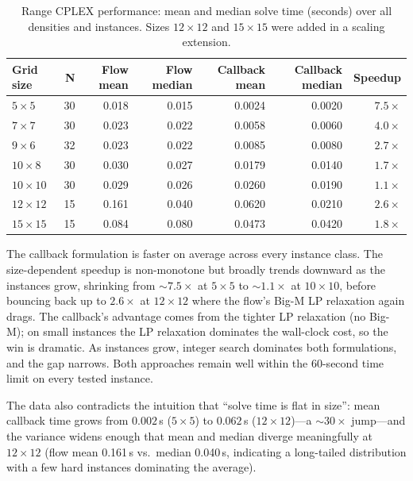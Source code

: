 \begin{table}[H]
  \centering
  \caption{Range CPLEX performance: mean and median solve time (seconds) over all densities and instances. Sizes $12\times12$ and $15\times15$ were added in a scaling extension.}
  \label{tab:range_summary}
  \begin{tabular}{lrrrrrr}
    \toprule
    Grid size & N & Flow mean & Flow median & Callback mean & Callback median & Speedup \\
    \midrule
    $5  \times 5$   & 30 & 0.018 & 0.015 & 0.0024 & 0.0020 & $7.5\times$ \\
    $7  \times 7$   & 30 & 0.023 & 0.022 & 0.0058 & 0.0060 & $4.0\times$ \\
    $9  \times 6$   & 32 & 0.023 & 0.022 & 0.0085 & 0.0080 & $2.7\times$ \\
    $10 \times 8$   & 30 & 0.030 & 0.027 & 0.0179 & 0.0140 & $1.7\times$ \\
    $10 \times 10$  & 30 & 0.029 & 0.026 & 0.0260 & 0.0190 & $1.1\times$ \\
    $12 \times 12$  & 15 & 0.161 & 0.040 & 0.0620 & 0.0210 & $2.6\times$ \\
    $15 \times 15$  & 15 & 0.084 & 0.080 & 0.0473 & 0.0420 & $1.8\times$ \\
    \bottomrule
  \end{tabular}
\end{table}

The callback formulation is faster on average across every instance class. The size-dependent speedup is non-monotone but broadly trends downward as the instances grow, shrinking from $\sim 7.5\times$ at $5 \times 5$ to $\sim 1.1\times$ at $10 \times 10$, before bouncing back up to $2.6\times$ at $12 \times 12$ where the flow's Big-M LP relaxation again drags. The callback's advantage comes from the tighter LP relaxation (no Big-M); on small instances the LP relaxation dominates the wall-clock cost, so the win is dramatic. As instances grow, integer search dominates both formulations, and the gap narrows. Both approaches remain well within the 60-second time limit on every tested instance.

The data also contradicts the intuition that ``solve time is flat in size'': mean callback time grows from $0.002$\,s ($5 \times 5$) to $0.062$\,s ($12 \times 12$)---a $\sim 30\times$ jump---and the variance widens enough that mean and median diverge meaningfully at $12 \times 12$ (flow mean 0.161\,s vs.\ median 0.040\,s, indicating a long-tailed distribution with a few hard instances dominating the average).

